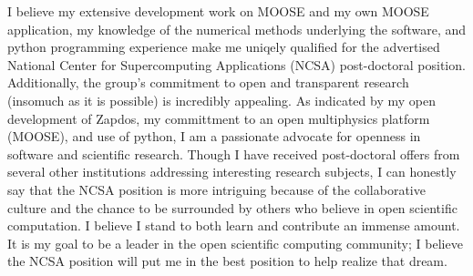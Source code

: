 I believe my extensive development work on MOOSE and my own MOOSE application, my knowledge of the numerical methods underlying the software, and python programming experience make me uniqely qualified for the advertised National Center for Supercomputing Applications (NCSA) post-doctoral position. Additionally, the group's commitment to open and transparent research (insomuch as it is possible) is incredibly appealing. As indicated by my open development of Zapdos, my committment to an open multiphysics platform (MOOSE), and use of python, I am a passionate advocate for openness in software and scientific research. Though I have received post-doctoral offers from several other institutions addressing interesting research subjects, I can honestly say that the NCSA position is more intriguing because of the collaborative culture and the chance to be surrounded by others who believe in open scientific computation. I believe I stand to both learn and contribute an immense amount. It is my goal to be a leader in the open scientific computing community; I believe the NCSA position will put me in the best position to help realize that dream.
